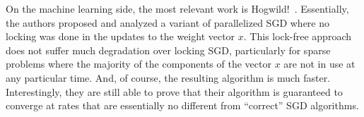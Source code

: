 \documentclass[12pt,leqno,twoside]{article}
\begin{document}
On the machine learning side, the most relevant work is
Hogwild!~\citep{niu11hogwild}. Essentially, the authors proposed
and analyzed a variant of parallelized SGD where no locking was
done in the updates to the weight vector $x$. This lock-free approach
does not suffer much degradation over locking SGD,  particularly
for sparse problems where the majority of the components of the
vector $x$ are not in use at any particular time. And, of course,
the resulting algorithm is much faster.  Interestingly, they are
still able to prove that their algorithm is guaranteed to converge
at rates that are essentially no different from ``correct'' SGD
algorithms.



 
\end{document}
